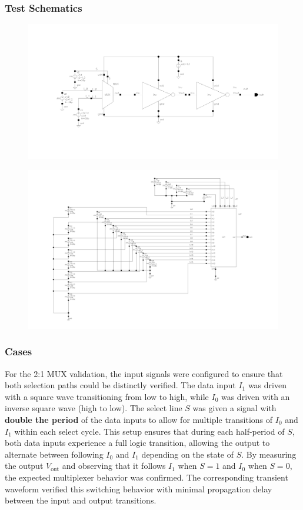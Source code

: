 \documentclass[12pt]{article}
\begin{document}
\subsubsection*{Test Schematics}

\begin{figure}[H]
    \centering
    \includegraphics[width=\linewidth]{writeup//figures/muxsubtestschem.png}
    \caption{}
\end{figure}

\begin{figure}[H]
    \centering
    \includegraphics[width=0.8\linewidth]{writeup//figures/luttestschem.png}
    \caption{}
\end{figure}

\subsubsection*{Cases}
For the 2:1 MUX validation, the input signals were configured to ensure that both selection paths could be distinctly verified. The data input \( I_1 \) was driven with a square wave transitioning from low to high, while \( I_0 \) was driven with an inverse square wave (high to low). The select line \( S \) was given a signal with \textbf{double the period} of the data inputs to allow for multiple transitions of \( I_0 \) and \( I_1 \) within each select cycle. 
This setup ensures that during each half-period of \( S \), both data inputs experience a full logic transition, allowing the output to alternate between following \( I_0 \) and \( I_1 \) depending on the state of \( S \). 
By measuring the output \( V_{\text{out}} \) and observing that it follows \( I_1 \) when \( S=1 \) and \( I_0 \) when \( S=0 \), the expected multiplexer behavior was confirmed. The corresponding transient waveform verified this switching behavior with minimal propagation delay between the input and output transitions.
\end{document}
